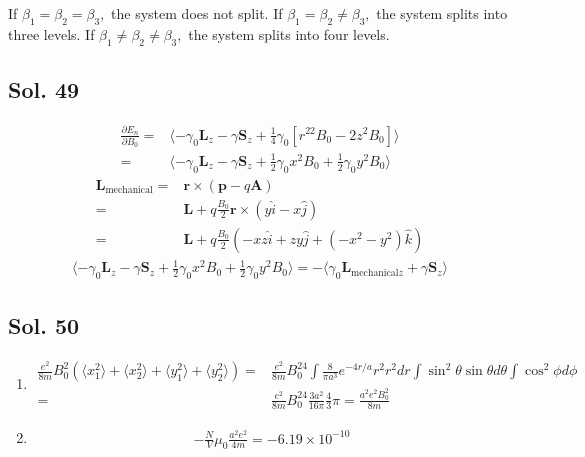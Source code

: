 \begin{enumerate}
    If $\beta_1=\beta_2=\beta_3,$ the system does not split. If $\beta_1=\beta_2\neq \beta_3,$ the system splits into three levels. 
    If $\beta_1\neq \beta_2\neq \beta_3,$ the system splits into four levels.



\end{enumerate}

\subsection*{Sol. 49}
\begin{align*}
    \frac{\partial E_n}{\partial B_0}
    =&\langle
    -\gamma_0\bm L_z-\gamma\bm S_z + 
    \frac{1}{4}\gamma_0
    [r^22B_0 - 2z^2B_0]
    \rangle\\
    =&
    \langle
    -\gamma_0\bm L_z-\gamma\bm S_z + 
    \frac{1}{2}\gamma_0x^2B_0 + 
    \frac{1}{2}\gamma_0y^2B_0 
    \rangle
\end{align*}
\begin{align*}
    \bm L_{\text{mechanical}}
    =&\bm r \times(\bm p - q\bm A)\\
    =&\bm L +q \frac{B_0}{2}\bm r\times(y\hat i-x\hat j)\\
    =&\bm L +q \frac{B_0}{2}(-xz\hat i + zy\hat j + (-x^2-y^2)\hat k)
\end{align*}
\begin{align*}
    \langle
    -\gamma_0\bm L_z-\gamma\bm S_z + 
    \frac{1}{2}\gamma_0x^2B_0 + 
    \frac{1}{2}\gamma_0y^2B_0 
    \rangle = 
    -\langle\gamma_0\bm L_{\text{mechanical}z} + \gamma\bm S_z\rangle
\end{align*}

\subsection*{Sol. 50}
\begin{enumerate}
    \item \begin{align*}
    \frac{e^2}{8m}B_0^2(
    \langle x_1^2\rangle
    +\langle x_2^2\rangle
    +\langle y_1^2\rangle
    +\langle y_2^2\rangle
    )=&
    \frac{e^2}{8m}B_0^24
    \int\frac{8}{\pi a^3}e^{-4r/a}r^2r^2dr
    \int \sin^2\theta \sin\theta d\theta 
    \int \cos^2\phi d\phi\\
    =&\frac{e^2}{8m}B_0^24\frac{3a^{2}}{16\pi}
    \frac{4}{3}\pi=
    \frac{a^2e^2B_0^2}{8m}
\end{align*}
\item 
\begin{align*}
    -\frac{N}{V}\mu_0
    \frac{a^2e^2}{4m}=-6.19\times 10^{-10}
\end{align*}
\end{enumerate}


